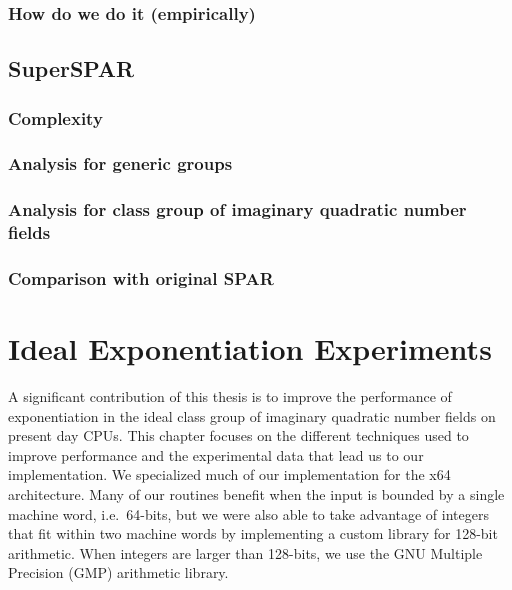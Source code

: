 \documentclass{ucalgthes1}
\theoremstyle{definition}
\begin{document}
\subsection{How do we do it (empirically)}


\section{SuperSPAR}
\label{sec:superSpar}

\subsection{Complexity}
\subsection{Analysis for generic groups}
\subsection{Analysis for class group of imaginary quadratic number fields}
\subsection{Comparison with original SPAR}


\chapter{Ideal Exponentiation Experiments}
\label{chap:idealExpExperiments}

A significant contribution of this thesis is to improve the performance of exponentiation in the ideal class group of imaginary quadratic number fields on present day CPUs.  This chapter focuses on the different techniques used to improve performance and the experimental data that lead us to our implementation.  We specialized much of our implementation for the x64 architecture.  Many of our routines benefit when the input is bounded by a single machine word, i.e.\ 64-bits, but we were also able to take advantage of integers that fit within two machine words by implementing a custom library for 128-bit arithmetic.  When integers are larger than 128-bits, we use the GNU Multiple Precision (GMP) arithmetic library.
\end{document}
